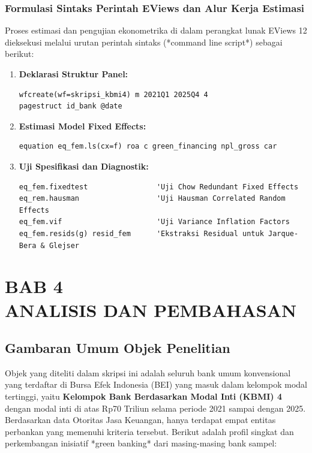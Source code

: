 \documentclass[12pt,a4paper]{article}
\numberwithin{equation}{section}
\begin{document}
\subsubsection{Formulasi Sintaks Perintah EViews dan Alur Kerja Estimasi}
\noindent
Proses estimasi dan pengujian ekonometrika di dalam perangkat lunak EViews 12 dieksekusi melalui urutan perintah sintaks (*command line script*) sebagai berikut:
\begin{enumerate}
  \item \textbf{Deklarasi Struktur Panel:}
\begin{verbatim}
wfcreate(wf=skripsi_kbmi4) m 2021Q1 2025Q4 4
pagestruct id_bank @date
\end{verbatim}
  \item \textbf{Estimasi Model Fixed Effects:}
\begin{verbatim}
equation eq_fem.ls(cx=f) roa c green_financing npl_gross car
\end{verbatim}
  \item \textbf{Uji Spesifikasi dan Diagnostik:}
\begin{verbatim}
eq_fem.fixedtest                'Uji Chow Redundant Fixed Effects
eq_rem.hausman                  'Uji Hausman Correlated Random Effects
eq_fem.vif                      'Uji Variance Inflation Factors
eq_fem.resids(g) resid_fem      'Ekstraksi Residual untuk Jarque-Bera & Glejser
\end{verbatim}
\end{enumerate}

\newpage
\setcounter{section}{0}
\section*{BAB 4\\[0.3cm]ANALISIS DAN PEMBAHASAN}
\setcounter{section}{4}
\setcounter{subsection}{0}
\setcounter{equation}{0}

\subsection{Gambaran Umum Objek Penelitian}

\noindent
Objek yang diteliti dalam skripsi ini adalah seluruh bank umum konvensional yang terdaftar di Bursa Efek Indonesia (BEI) yang masuk dalam kelompok modal tertinggi, yaitu \textbf{Kelompok Bank Berdasarkan Modal Inti (KBMI) 4} dengan modal inti di atas Rp70 Triliun selama periode 2021 sampai dengan 2025. Berdasarkan data Otoritas Jasa Keuangan, hanya terdapat empat entitas perbankan yang memenuhi kriteria tersebut. Berikut adalah profil singkat dan perkembangan inisiatif *green banking* dari masing-masing bank sampel:
\end{document}
